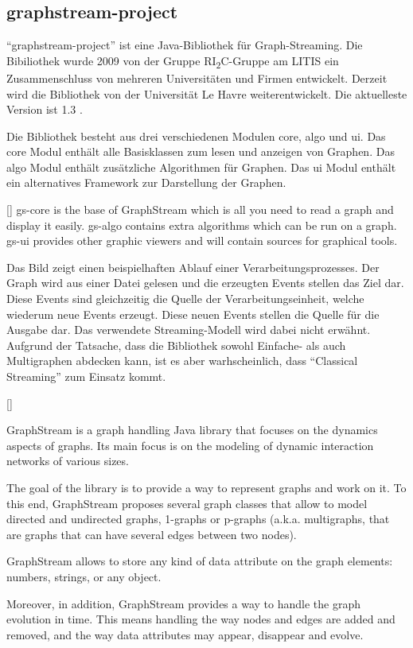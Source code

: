 \subsection{graphstream-project}
\enquote{graphstream-project} ist eine Java-Bibliothek für Graph-Streaming. Die
Bibiliothek wurde 2009 von der Gruppe RI\textsubscript{2}C-Gruppe am LITIS ein
Zusammenschluss von mehreren Universitäten und Firmen entwickelt. Derzeit wird
die Bibliothek von der Universität Le Havre weiterentwickelt. Die aktuelleste
Version ist 1.3 .

Die Bibliothek besteht aus drei verschiedenen Modulen core, algo und ui. Das core
Modul enthält alle Basisklassen zum lesen und anzeigen von Graphen. Das algo
Modul enthält zusätzliche Algorithmen für Graphen. Das ui Modul enthält ein
alternatives Framework zur Darstellung der Graphen.

[\cite{Team2018}]{
gs-core is the base of GraphStream which is all you need to read a graph and
display it easily. gs-algo contains extra algorithms which can be run on a graph.
gs-ui provides other graphic viewers and will contain sources for graphical tools.
}

Das Bild zeigt einen beispielhaften Ablauf einer Verarbeitungsprozesses. Der
Graph wird aus einer Datei gelesen und die erzeugten Events stellen das Ziel dar.
Diese Events sind gleichzeitig die Quelle der Verarbeitungseinheit, welche
wiederum neue Events erzeugt. Diese neuen Events stellen die Quelle für die
Ausgabe dar. Das verwendete Streaming-Modell wird dabei nicht erwähnt. Aufgrund
der Tatsache, dass die Bibliothek sowohl Einfache- als auch Multigraphen abdecken
kann, ist es aber warhscheinlich, dass \enquote{Classical Streaming} zum Einsatz
kommt.

[\cite{Team2018}]{
GraphStream is a graph handling Java library that focuses on the dynamics aspects
of graphs. Its main focus is on the modeling of dynamic interaction networks of
various sizes.

The goal of the library is to provide a way to represent graphs and work on it.
To this end, GraphStream proposes several graph classes that allow to model
directed and undirected graphs, 1-graphs or p-graphs (a.k.a. multigraphs, that
are graphs that can have several edges between two nodes).

GraphStream allows to store any kind of data attribute on the graph elements:
numbers, strings, or any object.

Moreover, in addition, GraphStream provides a way to handle the graph evolution
in time. This means handling the way nodes and edges are added and removed, and
the way data attributes may appear, disappear and evolve.
}

